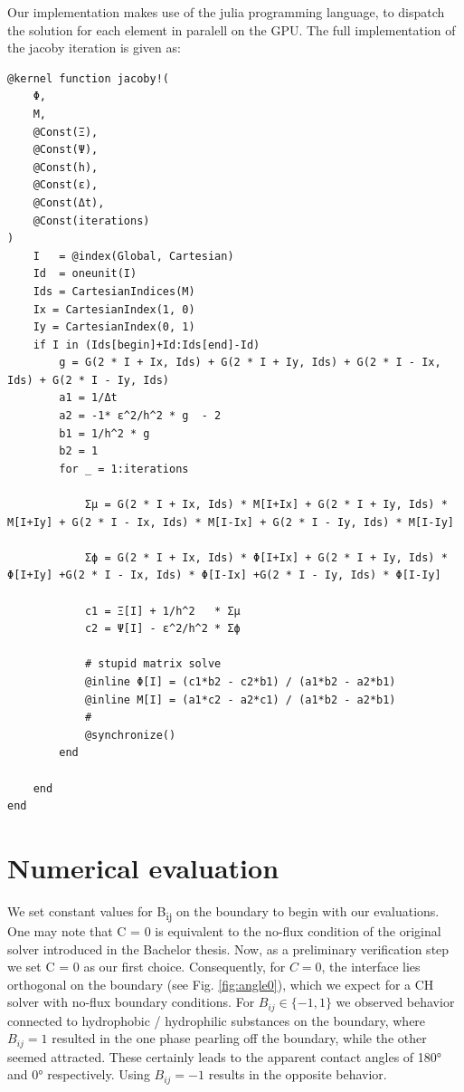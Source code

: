 \documentclass{mimosis}
\begin{document}
Our implementation makes use of the julia programming language, to dispatch the solution for each element in paralell on the GPU. The full implementation of the jacoby iteration is given as:
\begin{verbatim}
@kernel function jacoby!(
    Φ,
    M,
    @Const(Ξ),
    @Const(Ψ),
    @Const(h),
    @Const(ε),
    @Const(Δt),
    @Const(iterations)
)
    I   = @index(Global, Cartesian)
    Id  = oneunit(I)
    Ids = CartesianIndices(M)
    Ix = CartesianIndex(1, 0)
    Iy = CartesianIndex(0, 1)
    if I in (Ids[begin]+Id:Ids[end]-Id)
        g = G(2 * I + Ix, Ids) + G(2 * I + Iy, Ids) + G(2 * I - Ix, Ids) + G(2 * I - Iy, Ids)
        a1 = 1/Δt
        a2 = -1* ε^2/h^2 * g  - 2
        b1 = 1/h^2 * g
        b2 = 1
        for _ = 1:iterations

            Σμ = G(2 * I + Ix, Ids) * M[I+Ix] + G(2 * I + Iy, Ids) * M[I+Iy] + G(2 * I - Ix, Ids) * M[I-Ix] + G(2 * I - Iy, Ids) * M[I-Iy]

            Σϕ = G(2 * I + Ix, Ids) * Φ[I+Ix] + G(2 * I + Iy, Ids) * Φ[I+Iy] +G(2 * I - Ix, Ids) * Φ[I-Ix] +G(2 * I - Iy, Ids) * Φ[I-Iy]

            c1 = Ξ[I] + 1/h^2   * Σμ
            c2 = Ψ[I] - ε^2/h^2 * Σϕ

            # stupid matrix solve
            @inline Φ[I] = (c1*b2 - c2*b1) / (a1*b2 - a2*b1)
            @inline M[I] = (a1*c2 - a2*c1) / (a1*b2 - a2*b1)
            #
            @synchronize()
        end

    end
end
\end{verbatim}
\chapter{Numerical evaluation}
\label{sec:orgb47f456}
We set constant values for B\textsubscript{ij} on the boundary to begin with our evaluations.
One may note that C = 0 is equivalent to the no-flux condition of the original solver introduced in the Bachelor thesis. Now, as a preliminary verification step we set C = 0 as our first choice.
Consequently, for \(C = 0\), the interface lies orthogonal on the boundary (see Fig. \ref{fig:angle0}), which we expect for a CH solver with no-flux boundary conditions.
For \(B_{ij} \in \{-1,1\}\) we observed behavior connected to hydrophobic / hydrophilic substances on the boundary, where \(B_{ij}=1\) resulted in the one phase pearling off the boundary, while the other seemed attracted. These certainly leads to the apparent contact angles of 180° and 0° respectively. Using \(B_{ij} = -1\) results in the opposite behavior.
\end{document}
